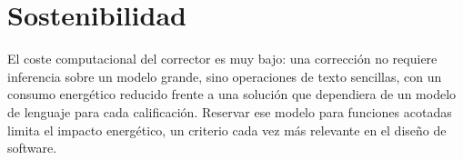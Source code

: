 \section{Sostenibilidad}

El coste computacional del corrector es muy bajo: una corrección no requiere inferencia sobre un modelo grande, sino operaciones de texto sencillas, con un consumo energético reducido frente a una solución que dependiera de un modelo de lenguaje para cada calificación. Reservar ese modelo para funciones acotadas limita el impacto energético, un criterio cada vez más relevante en el diseño de software.
